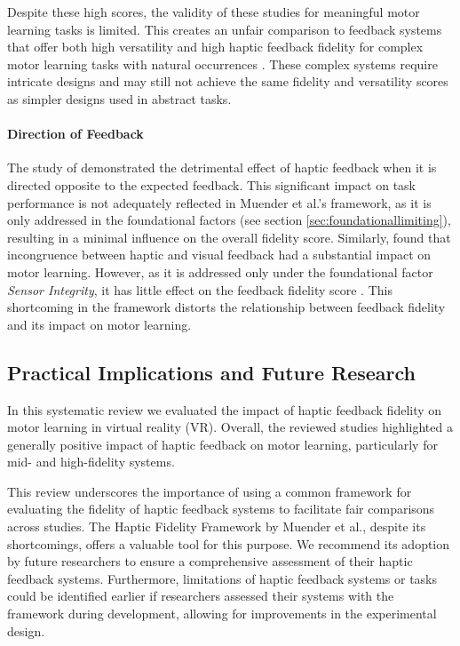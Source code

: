 Despite these high scores, the validity of these studies for meaningful motor learning tasks is limited. This creates an unfair comparison to feedback systems that offer both high versatility and high haptic feedback fidelity for complex motor learning tasks with natural occurrences \cite{LeeY2019, LiuH2019, Oezen2022}. These complex systems require intricate designs and may still not achieve the same fidelity and versatility scores as simpler designs used in abstract tasks.

\paragraph{Direction of Feedback}
The study of \cite{Macuga2019} demonstrated the detrimental effect of haptic feedback when it is directed opposite to the expected feedback. This significant impact on task performance is not adequately reflected in Muender et al.'s framework, as it is only addressed in the foundational factors (see section \ref{sec:foundationallimiting}), resulting in a minimal influence on the overall fidelity score. Similarly, \cite{Mohanty2023} found that incongruence between haptic and visual feedback had a substantial impact on motor learning. However, as it is addressed only under the foundational factor \textit{Sensor Integrity}, it has little effect on the feedback fidelity score \cite{Muender2022HapticReality}. This shortcoming in the framework distorts the relationship between feedback fidelity and its impact on motor learning.


\subsection{Practical Implications and Future Research}
In this systematic review we evaluated the impact of haptic feedback fidelity on motor learning in virtual reality (VR). Overall, the reviewed studies highlighted a generally positive impact of haptic feedback on motor learning, particularly for mid- and high-fidelity systems.

This review underscores the importance of using a common framework for evaluating the fidelity of haptic feedback systems to facilitate fair comparisons across studies. The Haptic Fidelity Framework by Muender et al., despite its shortcomings, offers a valuable tool for this purpose. We recommend its adoption by future researchers to ensure a comprehensive assessment of their haptic feedback systems. Furthermore, limitations of haptic feedback systems or tasks could be identified earlier if researchers assessed their systems with the framework during development, allowing for improvements in the experimental design.

